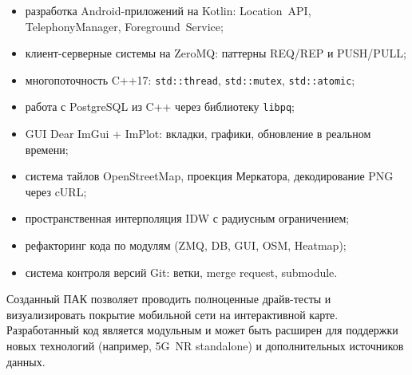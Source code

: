 \documentclass[a4paper,14pt,oneside,openany]{memoir}
\begin{document}
\begin{itemize}
  \item разработка Android-приложений на Kotlin: Location~API,
        TelephonyManager, Foreground~Service;
  \item клиент-серверные системы на ZeroMQ:
        паттерны REQ/REP и PUSH/PULL;
  \item многопоточность C++17:
        \texttt{std::thread}, \texttt{std::mutex}, \texttt{std::atomic};
  \item работа с PostgreSQL из C++ через библиотеку \texttt{libpq};
  \item GUI Dear ImGui + ImPlot:
        вкладки, графики, обновление в реальном времени;
  \item система тайлов OpenStreetMap,
        проекция Меркатора, декодирование PNG через cURL;
  \item пространственная интерполяция IDW с радиусным ограничением;
  \item рефакторинг кода по модулям (ZMQ, DB, GUI, OSM, Heatmap);
  \item система контроля версий Git:
        ветки, merge request, submodule.
\end{itemize}

Созданный ПАК позволяет проводить полноценные драйв-тесты и визуализировать
покрытие мобильной сети на интерактивной карте. Разработанный код является
модульным и может быть расширен для поддержки новых технологий (например,
5G~NR standalone) и дополнительных источников данных.

\nocite{*}
\printbibliography[title=Список использованных источников]
\end{document}
